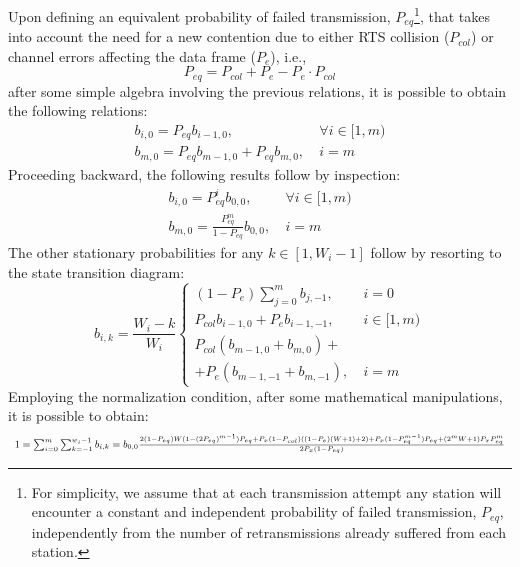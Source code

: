 \documentclass[10pt,onecolumn,a4paper]{IEEEtran}
\begin{document}
Upon defining an equivalent probability of failed transmission,
$P_{eq}$\footnote{For simplicity, we assume that at each
transmission attempt any station will encounter a constant and
independent probability of failed transmission, $P_{eq}$,
independently from the number of retransmissions already suffered
from each station.}, that takes into account the need for a new
contention due to either RTS collision ($P_{col}$) or channel
errors affecting the data frame ($P_e$), i.e.,
\begin{equation}\label{eq.equ}
P_{eq}=P_{col}+P_e-P_e\cdot  P_{col}
\end{equation}
after some simple algebra involving the previous relations, it is
possible to obtain the following relations:
\begin{equation}\label{collision_probabilities}
\begin{array}{ll}
 b_{i,0}=P_{eq} b_{i-1,0},& ~\forall i\in [1,m)\\
 b_{m,0}=P_{eq} b_{m-1,0}+P_{eq} b_{m,0},&~i=m
\end{array}
\end{equation}
Proceeding backward, the following results follow by inspection:
\begin{equation}\label{collision_probabilities_2}
\begin{array}{ll}
b_{i,0}=P_{eq}^ib_{0,0},&~\forall i\in [1,m)\\
b_{m,0}=\frac{P_{eq}^m}{1-P_{eq}}b_{0,0},&~i=m
\end{array}
\end{equation}
The other stationary probabilities for any $k\in[1,W_i-1]$ follow
by resorting to the state transition diagram:
\begin{equation}\label{eq.bik}
b_{i,k} = \frac{W_i-k}{W_i}\left\{
\begin{array}{ll}
(1-P_{e})\sum_{j=0}^m b_{j,-1}, &~i=0\\
P_{col}b_{i-1,0}+P_{e}b_{i-1,-1}, &~i\in [1,m)\\
P_{col}(b_{m-1,0}+b_{m,0})+\\
+P_{e}(b_{m-1,-1}+b_{m,-1}), &~ i=m
\end{array} \right.
\end{equation}
Employing the normalization condition, after some mathematical
manipulations, it is possible to obtain:
\begin{equation}\small
\begin{array}{l}
1=\sum_{i=0}^m \sum_{k=-1}^{w_i-1} b_{i,k}= b_{0,0}
\frac{2(1-P_{eq})W(1-(2P_{eq})^{m-1})P_{eq}+
P_x(1-P_{col})\left((1-P_{e})(W+1)+2\right)+
P_x(1-P_{eq}^{m-1})P_{eq}+(2^mW+1)P_xP_{eq}^{m}}{2P_x(1-P_{eq})}
\end{array}
\end{equation}
\end{document}
